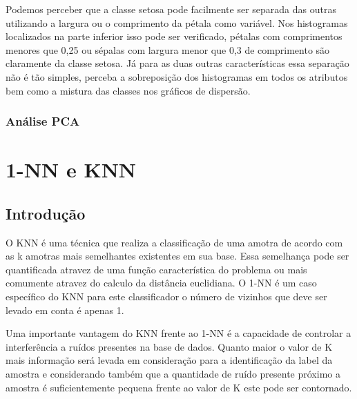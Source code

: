 \documentclass[
	article,			%
	11pt,				%
	oneside,			%
	a4paper,			%
	english,			%
	brazil,				%
	]{abntex2}
\begin{document}
 Podemos perceber que a classe setosa pode facilmente ser separada das outras
 utilizando a largura ou o comprimento da pétala como variável. Nos histogramas
 localizados na parte inferior isso pode ser verificado, pétalas com
 comprimentos menores que 0,25 ou sépalas com largura menor que 0,3 de
 comprimento são claramente da classe setosa.
 Já para as duas outras características essa separação não é tão simples,
 perceba a sobreposição dos histogramas em todos os atributos bem como a mistura
 das classes nos gráficos de dispersão.
 
 \subsubsection{Análise PCA}
%  
% 
% 
% 



\section{1-NN e KNN}

\subsection{Introdução}
O KNN é uma técnica que realiza a classificação de uma amotra de acordo com as k
amotras mais semelhantes existentes em sua base. Essa semelhança pode ser
quantificada atravez de uma função característica do problema ou mais comumente
atravez do calculo da distância euclidiana. O 1-NN é um caso específico do KNN
para este classificador o número de vizinhos que deve ser levado em conta é
apenas 1.

Uma importante vantagem do KNN frente ao 1-NN é a capacidade de controlar a
interferência a ruídos presentes na base de dados. Quanto maior o valor de K
mais informação será levada em consideração para a identificação da label da
amostra e considerando também que a quantidade de ruído presente próximo a
amostra é suficientemente pequena frente ao valor de K este pode ser contornado.
\end{document}
